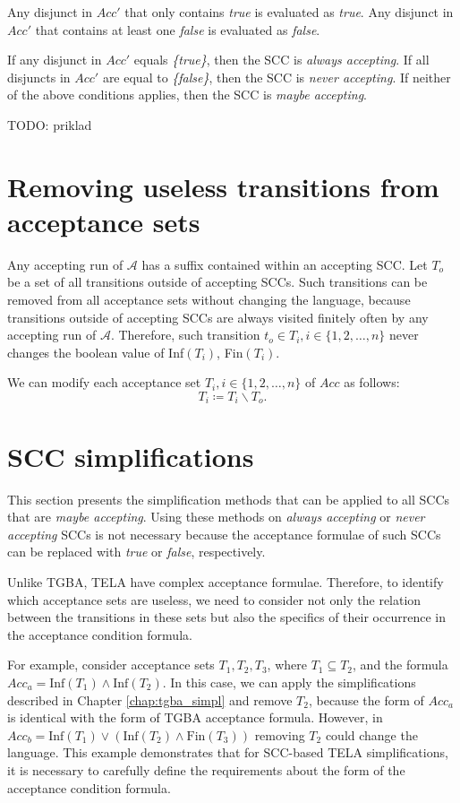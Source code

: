 \documentclass[
  digital, %
  twoside, %
  table,   %
  lof,     %
  lot,     %
]{fithesis3}
\begin{document}
Any disjunct in $Acc'$ that only contains \emph{true} is evaluated as \emph{true}. Any disjunct in $Acc'$ that contains at least one \emph{false} is evaluated as \emph{false}. 

If any disjunct in $Acc'$ equals \emph{\{true\}}, then the SCC is \emph{always accepting}. If all disjuncts in $Acc'$ are equal to \emph{\{false\}}, then the SCC is \emph{never accepting}. If neither of the above conditions applies, then the SCC is \emph{maybe accepting}.

TODO: priklad

\section{Removing useless transitions from acceptance sets}
Any accepting run of $\mathcal{A}$ has a suffix contained within an accepting SCC. Let $T_{o}$ be a set of all transitions outside of accepting SCCs. Such transitions can be removed from all acceptance sets without changing the language, because transitions outside of accepting SCCs are always visited finitely often by any accepting run of $\mathcal{A}$. Therefore, such transition $t_{o} \in T_i, i \in \{1, 2, \dots, n\}$ never changes the boolean value of Inf$(T_i)$, Fin$(T_i)$.

We can modify each acceptance set $T_i, i \in \{1, 2, \dots, n\}$ of $Acc$ as follows:
\begin{equation*}
  T_i \coloneqq T_i \smallsetminus T_{o}.
\end{equation*}

\section{SCC simplifications}
This section presents the simplification methods that can be applied to all SCCs that are \emph{maybe accepting}. Using these methods on \emph{always accepting} or \emph{never accepting} SCCs is not necessary because the acceptance formulae of such SCCs can be replaced with \emph{true} or \emph{false}, respectively. 

Unlike TGBA, TELA have complex acceptance formulae. Therefore, to identify which acceptance sets are useless, we need to consider not only the relation between the transitions in these sets but also the specifics of their occurrence in the acceptance condition formula. 

For example, consider acceptance sets $T_1, T_2, T_3$, where $T_1 \subseteq T_2$, and the formula $Acc_a = \text{Inf}(T_1) \wedge \text{Inf}(T_2)$. In this case, we can apply the simplifications described in Chapter \ref{chap:tgba_simpl} and remove $T_2$, because the form of $Acc_a$ is identical with the form of TGBA acceptance formula. However, in $Acc_b = \text{Inf}(T_1) \vee (\text{Inf}(T_2) \wedge \text{Fin}(T_3))$ removing $T_2$ could change the language. This example demonstrates that for SCC-based TELA simplifications, it is necessary to carefully define the requirements about the form of the acceptance condition formula.
\end{document}
